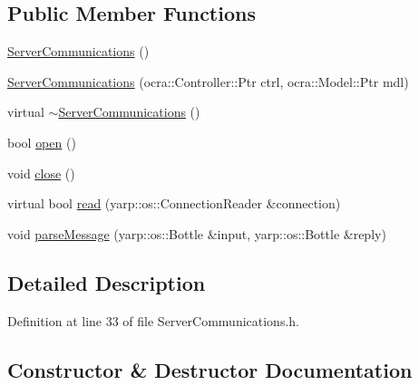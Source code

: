 \subsection*{Public Member Functions}
\begin{DoxyCompactItemize}
\item 
\hyperlink{classocra__recipes_1_1ServerCommunications_aa2a8a9d66c8ade82af5f27d550423370}{Server\+Communications} ()
\item 
\hyperlink{classocra__recipes_1_1ServerCommunications_acfb66941fd506637d019a620628a6c42}{Server\+Communications} (ocra\+::\+Controller\+::\+Ptr ctrl, ocra\+::\+Model\+::\+Ptr mdl)
\item 
virtual \hyperlink{classocra__recipes_1_1ServerCommunications_a1a24bf1fe5d2776e0cc9d3910ae226b9}{$\sim$\+Server\+Communications} ()
\item 
bool \hyperlink{classocra__recipes_1_1ServerCommunications_afef1a369ff040f5c774cd5d9533a817f}{open} ()
\item 
void \hyperlink{classocra__recipes_1_1ServerCommunications_a412d7330d0fcb83a51a105d4a261e5db}{close} ()
\item 
virtual bool \hyperlink{classocra__recipes_1_1ServerCommunications_a3a3430656af5150bb28b2012c3cd7004}{read} (yarp\+::os\+::\+Connection\+Reader \&connection)
\item 
void \hyperlink{classocra__recipes_1_1ServerCommunications_a66c219902af82f3edb98652c31093c45}{parse\+Message} (yarp\+::os\+::\+Bottle \&input, yarp\+::os\+::\+Bottle \&reply)
\end{DoxyCompactItemize}


\subsection{Detailed Description}


Definition at line 33 of file Server\+Communications.\+h.



\subsection{Constructor \& Destructor Documentation}
\hypertarget{classocra__recipes_1_1ServerCommunications_aa2a8a9d66c8ade82af5f27d550423370}{}\label{classocra__recipes_1_1ServerCommunications_aa2a8a9d66c8ade82af5f27d550423370} 
